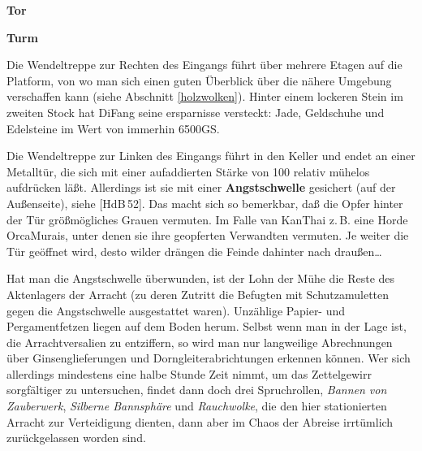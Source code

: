 \documentclass[
a4paper,
twoside,
DIV=calc,
BCOR=4mm,
fontsize=9pt,
twocolumn=on,
titlepage=on,
parskip=half
]{scrartcl}
\begin{document}
\textbf{ Tor}


\textbf{ Turm}


Die Wendeltreppe zur Rechten des Eingangs führt über mehrere Etagen
auf die Platform, von wo man sich einen guten Überblick über die
nähere Umgebung verschaffen kann (siehe Abschnitt
\ref{holzwolken}). Hinter einem lockeren Stein im zweiten Stock hat
DiFang seine ersparnisse versteckt: Jade, Geldschuhe und Edelsteine im
Wert von immerhin 6500GS.

Die Wendeltreppe zur Linken des Eingangs führt in den Keller und endet
an einer Metalltür, die sich mit einer aufaddierten Stärke von
100 relativ mühelos aufdrücken läßt. Allerdings ist sie mit einer
\textbf{Angstschwelle} gesichert (auf der Außenseite), siehe
[HdB\,52]. Das macht sich so bemerkbar, daß die Opfer hinter der Tür
größmögliches Grauen vermuten. Im Falle van KanThai z.\,B. eine Horde
OrcaMurais, unter denen sie ihre geopferten Verwandten vermuten. Je
weiter die Tür geöffnet wird, desto wilder drängen die Feinde dahinter
nach draußen\dots

Hat man die Angstschwelle überwunden, ist der Lohn der Mühe die Reste
des Aktenlagers der Arracht (zu deren Zutritt die Befugten mit
Schutzamuletten gegen die Angstschwelle ausgestattet waren). Unzählige
Papier- und Pergamentfetzen liegen auf dem Boden herum. Selbst wenn
man in der Lage ist, die Arrachtversalien zu entziffern, so wird man
nur langweilige Abrechnungen über Ginsenglieferungen und
Dorngleiterabrichtungen erkennen können. Wer sich allerdings
mindestens eine halbe Stunde Zeit nimmt, um das Zettelgewirr
sorgfältiger zu untersuchen, findet dann doch drei Spruchrollen,
\emph{Bannen von Zauberwerk}, \emph{Silberne Bannsphäre} und
\emph{Rauchwolke}, die den hier stationierten Arracht zur Verteidigung
dienten, dann aber im Chaos der Abreise irrtümlich zurückgelassen
worden sind.
\end{document}
